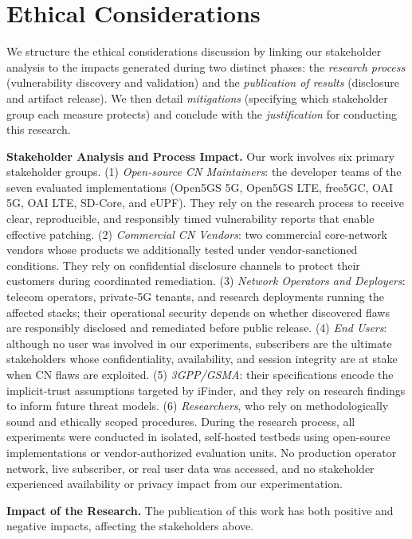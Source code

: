 \section*{Ethical Considerations}
We structure the ethical considerations discussion by linking our stakeholder analysis to the impacts generated during two distinct phases: the \textit{research process} (vulnerability discovery and validation) and the \textit{publication of results} (disclosure and artifact release). We then detail \textit{mitigations} (specifying which stakeholder group each measure protects) and conclude with the \textit{justification} for conducting this research.


\noindent\textbf{Stakeholder Analysis and Process Impact.} Our work involves six primary stakeholder groups. 
(1) \textit{Open-source CN Maintainers}: the developer teams of the seven evaluated implementations (Open5GS 5G, Open5GS LTE, free5GC, OAI 5G, OAI LTE, SD-Core, and eUPF). They rely on the research process to receive clear, reproducible, and responsibly timed vulnerability reports that enable effective patching. 
(2) \textit{Commercial CN Vendors}: two commercial core-network vendors whose products we additionally tested under vendor-sanctioned conditions. They rely on confidential disclosure channels to protect their customers during coordinated remediation. 
(3) \textit{Network Operators and Deployers}: telecom operators, private-5G tenants, and research deployments running the affected stacks; their operational security depends on whether discovered flaws are responsibly disclosed and remediated before public release. 
(4) \textit{End Users}: although no user was involved in our experiments, subscribers are the ultimate stakeholders whose confidentiality, availability, and session integrity are at stake when CN flaws are exploited. 
(5) \textit{3GPP/GSMA}: their specifications encode the implicit-trust assumptions targeted by iFinder, and they rely on research findings to inform future threat models. 
(6) \textit{Researchers}, who rely on methodologically sound and ethically scoped procedures. During the research process, all experiments were conducted in isolated, self-hosted testbeds using open-source implementations or vendor-authorized evaluation units. No production operator network, live subscriber, or real user data was accessed, and no stakeholder experienced availability or privacy impact from our experimentation.

\noindent\textbf{Impact of the Research.} The publication of this work has both positive and negative impacts, affecting the stakeholders above.

